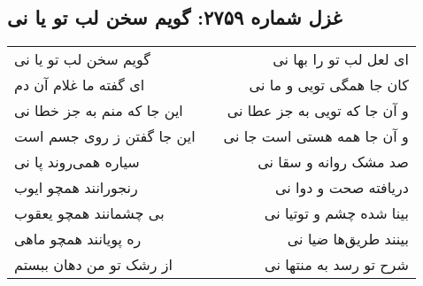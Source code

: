 \begin{center}
\section*{غزل شماره ۲۷۵۹: گویم سخن لب تو یا نی}
\label{sec:2759}
\begin{longtable}{l p{0.5cm} r}
گویم سخن لب تو یا نی
&&
ای لعل لب تو را بها نی
\\
ای گفته ما غلام آن دم
&&
کان جا همگی تویی و ما نی
\\
این جا که منم به جز خطا نی
&&
و آن جا که تویی به جز عطا نی
\\
این جا گفتن ز روی جسم است
&&
و آن جا همه هستی است جا نی
\\
سیاره همی‌روند پا نی
&&
صد مشک روانه و سقا نی
\\
رنجورانند همچو ایوب
&&
دریافته صحت و دوا نی
\\
بی چشمانند همچو یعقوب
&&
بینا شده چشم و توتیا نی
\\
ره پویانند همچو ماهی
&&
بینند طریق‌ها ضیا نی
\\
از رشک تو من دهان ببستم
&&
شرح تو رسد به منتها نی
\\
\end{longtable}
\end{center}
